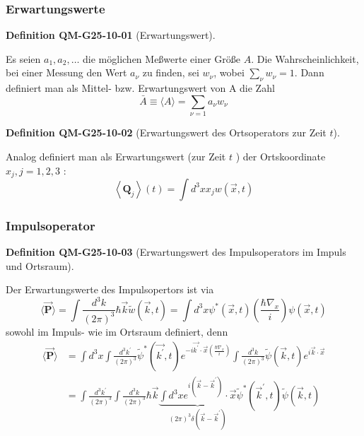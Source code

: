 \documentclass[10pt, letterpaper]{article}
\newcommand{\CustomHeading}[3]{%
  \par\medskip\noindent%
  \textbf{#1 #2} \textnormal{(#3)}.\enskip%
}
\newenvironment{DEF}[2]{\begin{unitbox}\CustomHeading{Definition}{#1}{#2}}{\end{unitbox}}
\begin{document}
\subsubsection*{Erwartungswerte}


\begin{DEF}{QM-G25-10-01}{Erwartungswert}
Es seien $a_{1}, a_{2}, \ldots$ die möglichen Meßwerte einer Größe $A$. Die Wahrscheinlichkeit, bei einer Messung den Wert $a_{\nu}$ zu finden, sei $w_{\nu}$, wobei $\sum_{\nu} w_{\nu}=1$. Dann definiert man als Mittel- bzw. Erwartungswert von A die Zahl
$$
\bar{A} \equiv\langle A\rangle=\sum_{\nu=1} a_{\nu} w_{\nu}
$$
\end{DEF}

\begin{DEF}{QM-G25-10-02}{Erwartungswert des Ortsoperators zur Zeit $t$}
Analog definiert man als Erwartungswert (zur Zeit $t$ ) der Ortskoordinate $x_{j}, j=1,2,3$ :
$$
\left\langle\mathbf{Q}_{j}\right\rangle(t)=\int d^{3} x x_{j} w(\vec{x}, t)
$$
\end{DEF}

\subsubsection*{Impulsoperator}

\begin{DEF}{QM-G25-10-03}{Erwartungswert des Impulsoperators im Impuls und Ortsraum}
Der Erwartungswerte des Impulsopertors ist via
$$
\langle\overrightarrow{\mathbf{P}}\rangle=\int \frac{d^{3} k}{(2 \pi)^{3}} \hbar \vec{k} \tilde{w}(\vec{k}, t)=\int d^{3} x \psi^{*}(\vec{x}, t)\left(\frac{\hbar \nabla_{x}}{i}\right) \psi(\vec{x}, t)
$$
sowohl im Impuls- wie im Ortsraum definiert, denn
$$
\begin{aligned}
\langle\overrightarrow{\mathbf{P}}\rangle & =\int d^{3} x \int \frac{d^{3} k^{\prime}}{(2 \pi)^{3}} \tilde{\psi}^{*}\left(\overrightarrow{k^{\prime}}, t\right) e^{-i \overrightarrow{k^{\prime}} \cdot \vec{x}\left(\frac{\hbar \nabla_{x}}{i}\right)} \int \frac{d^{3} k}{(2 \pi)^{3}} \tilde{\psi}(\vec{k}, t) e^{i \vec{k} \cdot \vec{x}} \\
& =\int \frac{d^{3} k^{\prime}}{(2 \pi)^{3}} \int \frac{d^{3} k}{(2 \pi)^{3}} \hbar \vec{k} \underbrace{\int d^{3} x e^{i\left(\vec{k}-\vec{k}^{\prime}\right)} \cdot \vec{x}}_{(2 \pi)^{3} \delta\left(\vec{k}-\vec{k}^{\prime}\right)} \tilde{\psi}^{*}\left(\vec{k}^{\prime}, t\right) \tilde{\psi}(\vec{k}, t)
\end{aligned}
$$
\end{DEF}
\end{document}
